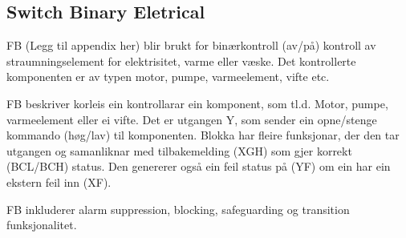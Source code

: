 \newpage

\subsection{Switch Binary Eletrical} 

\gls{FB} (Legg til appendix her) blir brukt for binærkontroll (av/på) kontroll av straumningselement for elektrisitet, varme eller væske. Det
kontrollerte komponenten er av typen motor, pumpe, varmeelement, vifte etc.

\gls{FB} beskriver korleis ein kontrollarar ein komponent, som tl.d. Motor, pumpe, varmeelement eller ei vifte.
Det er utgangen Y, som sender ein opne/stenge kommando (høg/lav) til komponenten. Blokka har fleire funksjonar, der den
tar utgangen og samanliknar med tilbakemelding (XGH) som gjer korrekt (BCL/BCH) status. Den genererer også ein feil status på
(YF) om ein har ein ekstern feil inn (XF).

\gls{FB} inkluderer alarm suppression, blocking, safeguarding og transition funksjonalitet.

